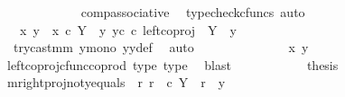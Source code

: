 \begin{isabellebody}
\ \ \ \ \ \ \ \ \ \ \isamarkupfalse%
\ \ comp{\isacharunderscore}{\kern0pt}associative{}\ \isamarkupfalse%
\ {\isacharparenleft}{\kern0pt}typecheck{\isacharunderscore}{\kern0pt}cfuncs{\isacharcomma}{\kern0pt}\ auto{\isacharparenright}{\kern0pt}\isanewline
\ \ \ \ \ \ \ \ \isamarkupfalse%
\ \isamarkupfalse%
\ {\isachardoublequoteopen}{\isachardot}{\kern0pt}{\isachardot}{\kern0pt}{\isachardot}{\kern0pt}\ {\isacharequal}{\kern0pt}\ {\isacharparenleft}{\kern0pt}{\isasymlangle}x{}{\isacharcomma}{\kern0pt}\ y{}{\isasymrangle}\ {\isasymamalg}\ {\isasymlangle}x{}\ {\isasymcirc}\isactrlsub c\ {\isasymbeta}\isactrlbsub Y\ {\isasymsetminus}\ {\isacharparenleft}{\kern0pt}{\isasymone}{\isacharcomma}{\kern0pt}y{}{\isacharparenright}{\kern0pt}\isactrlesub {\isacharcomma}{\kern0pt}\ y{}\isactrlsup c{\isasymrangle}{\isacharparenright}{\kern0pt}\ {\isasymcirc}\isactrlsub c\ left{\isacharunderscore}{\kern0pt}coproj\ {\isasymone}\ {\isacharparenleft}{\kern0pt}Y\ {\isasymsetminus}\ {\isacharparenleft}{\kern0pt}{\isasymone}{\isacharcomma}{\kern0pt}y{}{\isacharparenright}{\kern0pt}{\isacharparenright}{\kern0pt}{\isachardoublequoteclose}\isanewline
\ \ \ \ \ \ \ \ \ \ \isamarkupfalse%
\ \ try{\isacharunderscore}{\kern0pt}cast{\isacharunderscore}{\kern0pt}m{\isacharunderscore}{\kern0pt}m\ y{}{\isacharunderscore}{\kern0pt}mono\ y{}y{}{\isacharunderscore}{\kern0pt}def{\isacharparenleft}{\kern0pt}{}{\isacharparenright}{\kern0pt}\ \isamarkupfalse%
\ auto\isanewline
\ \ \ \ \ \ \ \ \isamarkupfalse%
\ \isamarkupfalse%
\ {\isachardoublequoteopen}{\isachardot}{\kern0pt}{\isachardot}{\kern0pt}{\isachardot}{\kern0pt}\ {\isacharequal}{\kern0pt}\ \ {\isasymlangle}x{}{\isacharcomma}{\kern0pt}\ y{}{\isasymrangle}{\isachardoublequoteclose}\isanewline
\ \ \ \ \ \ \ \ \ \ \isamarkupfalse%
\ left{\isacharunderscore}{\kern0pt}coproj{\isacharunderscore}{\kern0pt}cfunc{\isacharunderscore}{\kern0pt}coprod\ type{}\ type{}\ \isamarkupfalse%
\ blast\isanewline
\ \ \ \ \ \ \ \ \isamarkupfalse%
\ \isamarkupfalse%
\ {\isacharquery}{\kern0pt}thesis\isacommand{{\isachardot}{\kern0pt}}\isamarkupfalse%
\isanewline
\ \ \ \ \ \ \isamarkupfalse%
\isanewline
\isanewline
\ \ \ \ \ \ \isamarkupfalse%
\ m{\isacharunderscore}{\kern0pt}rightproj{\isacharunderscore}{\kern0pt}not{\isacharunderscore}{\kern0pt}y{}{\isacharunderscore}{\kern0pt}equals{\isacharcolon}{\kern0pt}\ {\isachardoublequoteopen}{\isasymAnd}\ r{\isachardot}{\kern0pt}\ r\ \ {\isasymin}\isactrlsub c\ Y\ {\isasymand}\ r\ {\isasymnoteq}\ y{}\ {\isasymLongrightarrow}\isanewline

\end{isabellebody}
